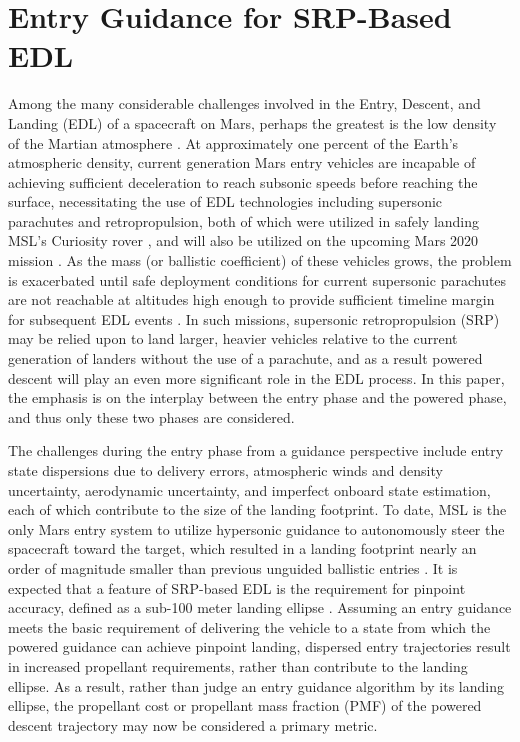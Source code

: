 \chapter{Entry Guidance for SRP-Based EDL}\label{Ch:FuelOptimalPaper}

Among the many considerable challenges involved in the Entry, Descent, and Landing (EDL) of a spacecraft on Mars, perhaps the greatest is the low density of the Martian atmosphere \cite{BraunMarsEDL, joel_dissertation}. At approximately one percent of the Earth's atmospheric density, current generation Mars entry vehicles are incapable of achieving sufficient deceleration to reach subsonic speeds before reaching the surface, necessitating the use of EDL technologies including supersonic parachutes and retropropulsion, both of which were utilized in safely landing MSL's Curiosity rover \cite{MSL_EDL}, and will also be utilized on the upcoming Mars 2020 mission \cite{M2020_EDL}. As the mass (or ballistic coefficient) of these vehicles grows, the problem is exacerbated until safe deployment conditions for current supersonic parachutes are not reachable at altitudes high enough to provide sufficient timeline margin for subsequent EDL events \cite{BraunMarsEDL}. In such missions, supersonic retropropulsion (SRP) may be relied upon to land larger, heavier vehicles relative to the current generation of landers without the use of a parachute, and as a result powered descent will play an even more significant role in the EDL process. In this paper, the emphasis is on the interplay between the entry phase and the powered phase, and thus only these two phases are considered.

The challenges during the entry phase from a guidance perspective include entry state dispersions due to delivery errors, atmospheric winds and density uncertainty, aerodynamic uncertainty, and imperfect onboard state estimation, each of which contribute to the size of the landing footprint. To date, MSL is the only Mars entry system to utilize hypersonic guidance to autonomously steer the spacecraft toward the target, which resulted in a landing footprint nearly an order of magnitude smaller than previous unguided ballistic entries \cite{BraunMarsEDL}. 
It is expected that a feature of SRP-based EDL is the requirement for pinpoint accuracy, defined as a sub-100 meter landing ellipse \cite{GNC_Pinpoint}. Assuming an entry guidance meets the basic requirement of delivering the vehicle to a state from which the powered guidance can achieve pinpoint landing, dispersed entry trajectories result in increased propellant requirements, rather than contribute to the landing ellipse. As a result, rather than judge an entry guidance algorithm by its landing ellipse, the propellant cost or propellant mass fraction (PMF) of the powered descent trajectory may now be considered a primary metric.

